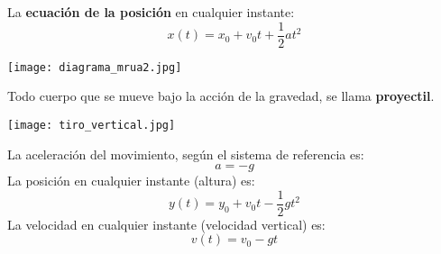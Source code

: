 La \textbf{ecuación de la posición} en cualquier instante:
$$\boxed{x(t) = x_0 + v_0 t + \frac{1}{2} a t^2}$$

\begin{center}
    \texttt{[image: diagrama\_mrua2.jpg]}
\end{center}

Todo cuerpo que se mueve bajo la acción de la gravedad, se llama \textbf{proyectil}.\begin{center}
    \texttt{[image: tiro\_vertical.jpg]}
\end{center}
La aceleración del movimiento, según el sistema de referencia es:
$$a = -g$$
La posición en cualquier instante (altura) es:
$$y(t) = y_0 + v_0 t - \frac{1}{2} g t^2$$
La velocidad en cualquier instante (velocidad vertical) es:
$$v(t) = v_0 - g t$$

